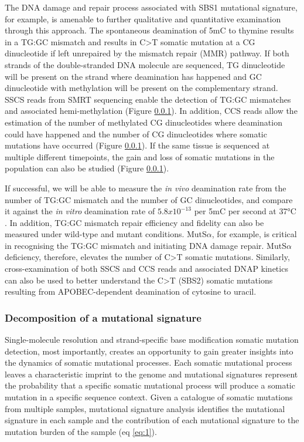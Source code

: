 The DNA damage and repair process associated with SBS1 mutational signature, for example, is amenable to further qualitative and quantitative examination through this approach. The spontaneous deamination of 5mC to thymine results in a TG:GC mismatch and results in C>T somatic mutation at a CG dinucleotide if left unrepaired by the mismatch repair (MMR) pathway. If both strands of the double-stranded DNA molecule are sequenced, TG dinucleotide will be present on the strand where deamination has happened and GC dinucleotide with methylation will be present on the complementary strand. SSCS reads from SMRT sequencing enable the detection of TG:GC mismatches and associated hemi-methylation (Figure \ref{}). In addition, CCS reads allow the estimation of the number of methylated CG dinucleotides where deamination could have happened and the number of CG dinucleotides where somatic mutations have occurred (Figure \ref{}). If the same tissue is sequenced at multiple different timepoints, the gain and loss of somatic mutations in the population can also be studied (Figure \ref{}).

If successful, we will be able to measure the \textit{in vivo} deamination rate from the number of TG:GC mismatch and the number of GC dinucleotides, and compare it against the \textit{in vitro} deamination rate of $5.8x10^{-13}$ per 5mC per second at 37°C \cite{}. In addition, TG:GC mismatch repair efficiency and fidelity can also be measured under wild-type and mutant conditions. MutS$\alpha$, for example, is critical in recognising the TG:GC mismatch and initiating DNA damage repair. MutS$\alpha$ deficiency, therefore, elevates the number of C>T somatic mutations. Similarly, cross-examination of both SSCS and CCS reads and associated DNAP kinetics can also be used to better understand the C>T (SBS2) somatic mutations resulting from APOBEC-dependent deamination of cytosine to uracil.  

\subsubsection{Decomposition of a mutational signature}
 
Single-molecule resolution and strand-specific base modification somatic mutation detection, most importantly, creates an opportunity to gain greater insights into the dynamics of somatic mutational processes. Each somatic mutational process leaves a characteristic imprint to the genome and mutational signatures represent the probability that a specific somatic mutational process will produce a somatic mutation in a specific sequence context. Given a catalogue of somatic mutations from multiple samples, mutational signature analysis identifies the mutational signature in each sample and the contribution of each mutational signature to the mutation burden of the sample (eq \ref{eq:1}).
 
